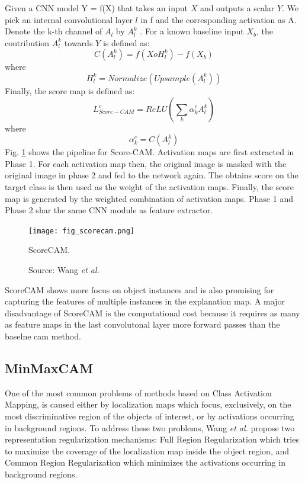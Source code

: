 Given a CNN model Y = f(X) that takes an input $X$ and outputs a scalar $Y$. We pick an internal convolutional layer $l$ in f and the corresponding activation as A. Denote the
k-th channel of $A_l$ by $A^k_l$ . For a known baseline input $X_b$,
the contribution $A^k_l$ towards $Y$ is defined as:
\begin{equation}
    C(A^k_l) = f(X o H^k_l) - f(X_b)
\end{equation}
where
\begin{equation}
    H^k_l = Normalize(Upsample(A^k_l))
\end{equation}
Finally, the score map is defined as:
\begin{equation}
    L^{c}_{Score-CAM} = ReLU(\sum_{k} \alpha^{c}_{k} A^k_l)
\end{equation}
where
\begin{equation}
    \alpha^{c}_{k} = C(A^k_l)
\end{equation}
Fig. \ref{fig:scorecam} shows the pipeline for Score-CAM. Activation maps are first extracted in Phase 1. For each activation map then, the original image is masked with the original image in phase 2 and fed to the network again. The obtains score on the target class is then used as the weight of the activation maps. Finally, the score map is generated by the weighted combination of activation maps. Phase 1 and Phase 2 shar the same CNN module as feature extractor. 
\begin{figure}[ht]
    \begin{center}       
    \texttt{[image: fig\_scorecam.png]}
    \caption[ScoreCAM]{ScoreCAM.}
    \caption*{Source: Wang \textit{et al.} \cite{wang2020score}}
    \label{fig:scorecam}
    \end{center}
\end{figure}

ScoreCAM shows more focus on object instances and is also promising for capturing the features of multiple instances in the explanation map. A major disadvantage of ScoreCAM is the computational cost because it requires as many as feature maps in the last convolutonal layer more forward passes than the baselne \acrshort{cam} method.

\subsection{MinMaxCAM}
One of the most common problems of methods based on Class Activation Mapping,
is caused either by localization maps which focus, exclusively, on the most discriminative region of the objects of interest, or by activations occurring
in background regions. To address these two problems, Wang \textit{et al.} \cite{wang2021minmaxcam} propose two representation regularization mechanisms: Full Region Regularization which tries to maximize the coverage of the localization map inside the object region, and Common Region Regularization which minimizes the activations occurring in background regions.

